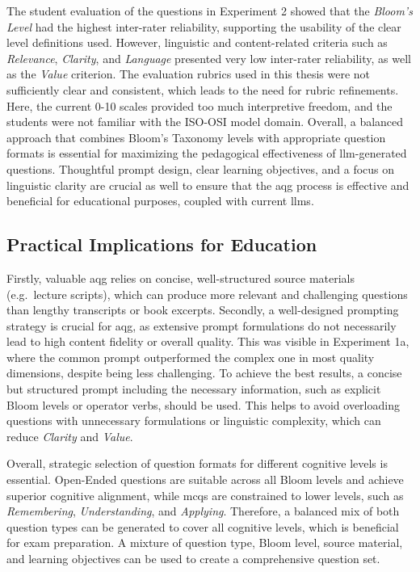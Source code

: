 The student evaluation of the questions in Experiment 2 showed that the \textit{Bloom's Level} had the highest inter-rater reliability, supporting the usability of the clear level definitions used. However, linguistic and content-related criteria such as \textit{Relevance}, \textit{Clarity}, and \textit{Language} presented very low inter-rater reliability, as well as the \textit{Value} criterion. The evaluation rubrics used in this thesis were not sufficiently clear and consistent, which leads to the need for rubric refinements. Here, the current 0-10 scales provided too much interpretive freedom, and the students were not familiar with the ISO-OSI model domain. Overall, a balanced approach that combines Bloom's Taxonomy levels with appropriate question formats is essential for maximizing the pedagogical effectiveness of \ac{llm}-generated questions. Thoughtful prompt design, clear learning objectives, and a focus on linguistic clarity are crucial as well to ensure that the \ac{aqg} process is effective and beneficial for educational purposes, coupled with current \acp{llm}.

\subsection{Practical Implications for Education}

Firstly, valuable \ac{aqg} relies on concise, well-structured source materials (e.g.\ lecture scripts), which can produce more relevant and challenging questions than lengthy transcripts or book excerpts. Secondly, a well-designed prompting strategy is crucial for \ac{aqg}, as extensive prompt formulations do not necessarily lead to high content fidelity or overall quality. This was visible in Experiment 1a, where the common prompt outperformed the complex one in most quality dimensions, despite being less challenging. To achieve the best results, a concise but structured prompt including the necessary information, such as explicit Bloom levels or operator verbs, should be used. This helps to avoid overloading questions with unnecessary formulations or linguistic complexity, which can reduce \textit{Clarity} and \textit{Value}.

Overall, strategic selection of question formats for different cognitive levels is essential. Open-Ended questions are suitable across all Bloom levels and achieve superior cognitive alignment, while \acp{mcq} are constrained to lower levels, such as \textit{Remembering}, \textit{Understanding}, and \textit{Applying}. Therefore, a balanced mix of both question types can be generated to cover all cognitive levels, which is beneficial for exam preparation. A mixture of question type, Bloom level, source material, and learning objectives can be used to create a comprehensive question set.

